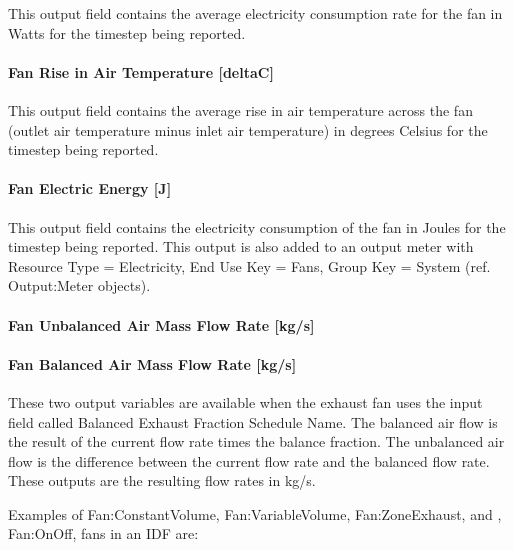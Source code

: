 This output field contains the average electricity consumption rate for the fan in Watts for the timestep being reported.

\paragraph{Fan Rise in Air Temperature {[}deltaC{]}}\label{fan-rise-in-air-temperature-deltac-3}

This output field contains the average rise in air temperature across the fan (outlet air temperature minus inlet air temperature) in degrees Celsius for the timestep being reported.

\paragraph{Fan Electric Energy {[}J{]}}\label{fan-electric-energy-j-3}

This output field contains the electricity consumption of the fan in Joules for the timestep being reported. This output is also added to an output meter with Resource Type = Electricity, End Use Key = Fans, Group Key = System (ref. Output:Meter objects).

\paragraph{Fan Unbalanced Air Mass Flow Rate {[}kg/s{]}}\label{fan-unbalanced-air-mass-flow-rate-kgs}

\paragraph{Fan Balanced Air Mass Flow Rate {[}kg/s{]}}\label{fan-balanced-air-mass-flow-rate-kgs}

These two output variables are available when the exhaust fan uses the input field called Balanced Exhaust Fraction Schedule Name. The balanced air flow is the result of the current flow rate times the balance fraction. The unbalanced air flow is the difference between the current flow rate and the balanced flow rate. These outputs are the resulting flow rates in kg/s.

Examples of Fan:ConstantVolume, Fan:VariableVolume, Fan:ZoneExhaust, and , Fan:OnOff, fans in an IDF are:

